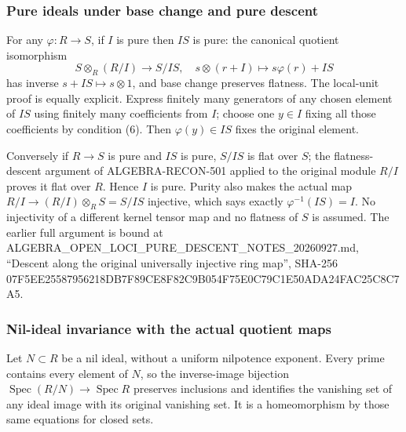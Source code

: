 \subsubsection{Pure ideals under base change and pure descent}\label{algebra-proof-022-pure-ideals-under-base-change-and-pure-descent}

For any \(\varphi:R\to S\), if \(I\) is pure then \(IS\) is pure: the canonical quotient isomorphism \[
S\otimes_R(R/I)\longrightarrow S/IS,\quad
s\otimes(r+I)\longmapsto s\varphi(r)+IS
\] has inverse \(s+IS\mapsto s\otimes1\), and base change preserves flatness. The local-unit proof is equally explicit. Express finitely many generators of any chosen element of \(IS\) using finitely many coefficients from \(I\); choose one \(y\in I\) fixing all those coefficients by condition (6). Then \(\varphi(y)\in IS\) fixes the original element.

Conversely if \(R\to S\) is pure and \(IS\) is pure, \(S/IS\) is flat over \(S\); the flatness-descent argument of ALGEBRA-\AlgebraIdentifierBreak{}RECON-\AlgebraIdentifierBreak{}501 applied to the original module \(R/I\) proves it flat over \(R\). Hence \(I\) is pure. Purity also makes the actual map \(R/I\to (R/I)\otimes_RS=S/IS\) injective, which says exactly \(\varphi^{-1}(IS)=I\). No injectivity of a different kernel tensor map and no flatness of \(S\) is assumed. The earlier full argument is bound at ALGEBRA\_\allowbreak{}OPEN\_\allowbreak{}LOCI\_\allowbreak{}PURE\_\allowbreak{}DESCENT\_\allowbreak{}NOTES\_\allowbreak{}20260927.\allowbreak{}md, ``Descent along the original universally injective ring map'', SHA-256 07F5\allowbreak{}EE25\allowbreak{}5879\allowbreak{}5621\allowbreak{}8DB7\allowbreak{}F89C\allowbreak{}E8F8\allowbreak{}2C9B\allowbreak{}054F\allowbreak{}75E0\allowbreak{}C79C\allowbreak{}1E50\allowbreak{}ADA2\allowbreak{}4FAC\allowbreak{}25C8\allowbreak{}C7A5.

\subsubsection{Nil-ideal invariance with the actual quotient maps}\label{algebra-proof-022-nil-ideal-invariance-with-the-actual-quotient-maps}

Let \(N\subset R\) be a nil ideal, without a uniform nilpotence exponent. Every prime contains every element of \(N\), so the inverse-image bijection \(\operatorname{Spec}(R/N)\to\operatorname{Spec}R\) preserves inclusions and identifies the vanishing set of any ideal image with its original vanishing set. It is a homeomorphism by those same equations for closed sets.

